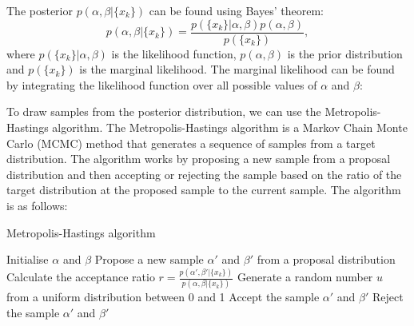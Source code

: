 \documentclass[11pt]{article}
\begin{document}
The posterior $p(\alpha, \beta | \{x_k\})$ can be found using Bayes' theorem:
\[
p(\alpha, \beta | \{x_k\}) = \frac{p(\{x_k\} | \alpha, \beta) p(\alpha, \beta)}{p(\{x_k\})},
\] where $p(\{x_k\} | \alpha, \beta)$ is the likelihood function, $p(\alpha, \beta)$ is the prior distribution and $p(\{x_k\})$ is the marginal likelihood. The marginal likelihood can be found by integrating the likelihood function over all possible values of $\alpha$ and $\beta$:

To draw samples from the posterior distribution, we can use the Metropolis-Hastings algorithm. The Metropolis-Hastings algorithm is a Markov Chain Monte Carlo (MCMC) method that generates a sequence of samples from a target distribution. The algorithm works by proposing a new sample from a proposal distribution and then accepting or rejecting the sample based on the ratio of the target distribution at the proposed sample to the current sample. The algorithm is as follows:

\begin{algorithm}
\caption{Metropolis-Hastings algorithm}
\begin{algorithmic}
\State Initialise $\alpha$ and $\beta$
    \State Propose a new sample $\alpha'$ and $\beta'$ from a proposal distribution
    \State Calculate the acceptance ratio $r = \frac{p(\alpha', \beta' | \{x_k\})}{p(\alpha, \beta | \{x_k\})}$
    \State Generate a random number $u$ from a uniform distribution between 0 and 1
        \State Accept the sample $\alpha'$ and $\beta'$
    \Else
        \State Reject the sample $\alpha'$ and $\beta'$
    \EndIf
\EndFor
\end{algorithmic}
\end{algorithm}
\end{document}
